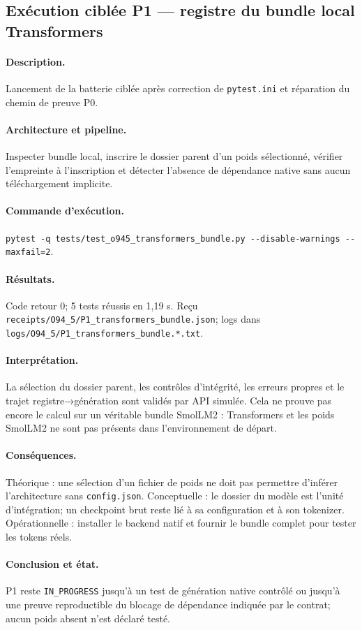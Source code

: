 \documentclass[11pt,a4paper]{article}
\begin{document}
\subsection{Exécution ciblée P1 — registre du bundle local Transformers}
\paragraph{Description.} Lancement de la batterie ciblée après correction de \texttt{pytest.ini} et réparation du chemin de preuve P0.
\paragraph{Architecture et pipeline.} Inspecter bundle local, inscrire le dossier parent d’un poids sélectionné, vérifier l’empreinte à l’inscription et détecter l’absence de dépendance native sans aucun téléchargement implicite.
\paragraph{Commande d’exécution.} \verb|pytest -q tests/test_o945_transformers_bundle.py --disable-warnings --maxfail=2|.
\paragraph{Résultats.} Code retour 0; 5 tests réussis en 1,19 s. Reçu \texttt{receipts/O94\_5/P1\_transformers\_bundle.json}; logs dans \texttt{logs/O94\_5/P1\_transformers\_bundle.*.txt}.
\paragraph{Interprétation.} La sélection du dossier parent, les contrôles d’intégrité, les erreurs propres et le trajet registre→génération sont validés par API simulée. Cela ne prouve pas encore le calcul sur un véritable bundle SmolLM2 : Transformers et les poids SmolLM2 ne sont pas présents dans l’environnement de départ.
\paragraph{Conséquences.} Théorique : une sélection d’un fichier de poids ne doit pas permettre d’inférer l’architecture sans \texttt{config.json}. Conceptuelle : le dossier du modèle est l’unité d’intégration; un checkpoint brut reste lié à sa configuration et à son tokenizer. Opérationnelle : installer le backend natif et fournir le bundle complet pour tester les tokens réels.
\paragraph{Conclusion et état.} P1 reste \texttt{IN\_PROGRESS} jusqu’à un test de génération native contrôlé ou jusqu’à une preuve reproductible du blocage de dépendance indiquée par le contrat; aucun poids absent n’est déclaré testé.
\end{document}

